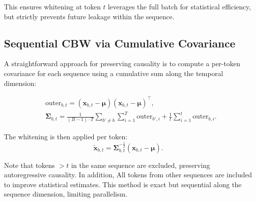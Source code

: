 This ensures whitening at token $t$ leverages the full batch for statistical efficiency, but strictly prevents future leakage within the sequence.


\iffalse

\subsection{Sequential CBW via Cumulative Covariance}

A straightforward approach for preserving causality is to compute a per-token covariance for each sequence using a cumulative sum along the temporal dimension:

\begin{align*}
&\text{outer}_{b,t} = (\mathbf{x}_{b,t} - \boldsymbol{\mu}) (\mathbf{x}_{b,t} - \boldsymbol{\mu})^\top, \\
&\boldsymbol{\Sigma}_{b,t} = \frac{1}{(B-1) \cdot T} \sum_{b' \neq b} \sum_{i=1}^{T} \text{outer}_{b',i} + \frac{1}{t} \sum_{i=1}^{t} \text{outer}_{b,i}.
\end{align*}

The whitening is then applied per token:
\begin{equation}
\tilde{\mathbf{x}}_{b,t} = \boldsymbol{\Sigma}_{b,t}^{-\frac{1}{2}} (\mathbf{x}_{b,t} - \boldsymbol{\mu}).
\end{equation}

Note that tokens $> t$ in the same sequence are excluded, preserving autoregressive causality.
In addition, All tokens from other sequences are included to improve statistical estimates.
This method is exact but sequential along the sequence dimension, limiting parallelism.

